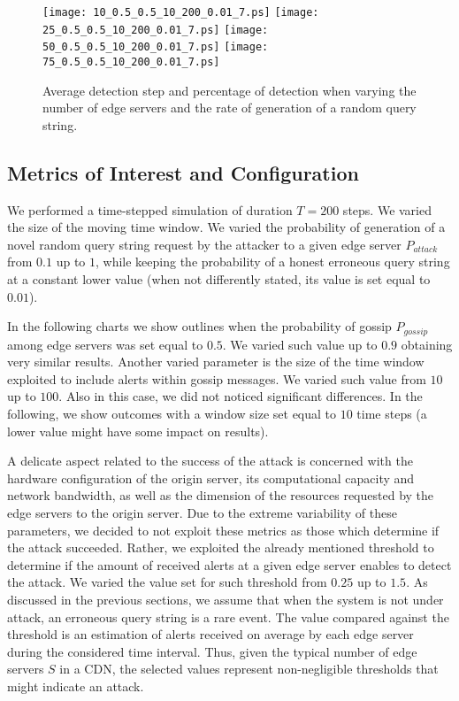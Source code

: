 \documentclass{IEEEtran}
\begin{document}
\begin{figure*}[t]
   \centering
   \texttt{[image: 10\_0.5\_0.5\_10\_200\_0.01\_7.ps]}
   \texttt{[image: 25\_0.5\_0.5\_10\_200\_0.01\_7.ps]}
   \texttt{[image: 50\_0.5\_0.5\_10\_200\_0.01\_7.ps]}
   \texttt{[image: 75\_0.5\_0.5\_10\_200\_0.01\_7.ps]}
   \caption{Average detection step and percentage of detection when varying the number of edge servers and the rate of generation of a random query string.}
   \label{fig:varia_es}
 \vspace{-0.2cm}
\end{figure*}

\subsection{Metrics of Interest and Configuration}

We performed a time-stepped simulation of duration $T=200$ steps. We varied the size of the moving time window.
We varied the probability of generation of a novel random query string request by the attacker to a given edge server $P_{attack}$ from $0.1$ up to $1$, while keeping the probability of a honest erroneous query string at a constant lower value (when not differently stated, its value is set equal to $0.01$).

In the following charts we show outlines when the probability of gossip $P_{gossip}$ among edge servers was set equal to $0.5$. We varied such value up to $0.9$ obtaining very similar results.
Another varied parameter is the size of the time window exploited to include alerts within gossip messages. We varied such value from $10$ up to $100$. Also in this case, we did not noticed significant differences. In the following, we show outcomes with a window size set equal to $10$ time steps (a lower value might have some impact on results).

A delicate aspect related to the success of the attack is concerned with the hardware configuration of the origin server, its computational capacity and network bandwidth, as well as the dimension of the resources requested by the edge servers to the origin server. Due to the extreme variability of these parameters, we decided to not exploit these metrics as those which determine if the attack succeeded. Rather, we exploited the already mentioned threshold to determine if the amount of received alerts at a given edge server enables to detect the attack. We varied the value set for such threshold from $0.25$ up to $1.5$. 
As discussed in the previous sections, we assume that when the system is not under attack, an erroneous query string is a rare event. The value compared against the threshold is an estimation of alerts received on average by each edge server during the considered time interval. Thus, given the typical number of edge servers $S$ in a CDN, the selected values represent non-negligible thresholds that might indicate an attack.
\end{document}
